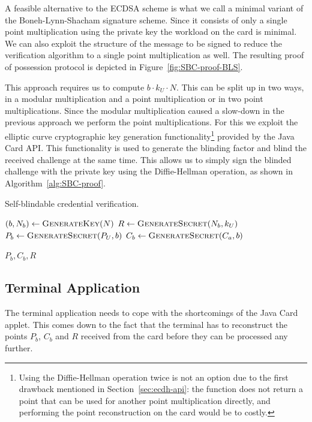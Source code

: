 A feasible alternative to the ECDSA scheme is what we call a minimal variant of
the Boneh-Lynn-Shacham signature scheme. Since it consists of only a single 
point multiplication using the private key the workload on the card is minimal.
We can also exploit the structure of the message to be signed to reduce the
verification algorithm to a single point multiplication as well. The resulting
proof of possession protocol is depicted in Figure~\ref{fig:SBC-proof-BLS}.

This approach requires us to compute $b \cdot k_U \cdot N$. This can be split
up in two ways, in a modular multiplication and a point multiplication or in two
point multiplications. Since the modular multiplication caused a slow-down in
the previous approach we perform the point multiplications. For this we exploit
the elliptic curve cryptographic key generation functionality\footnote{Using
the Diffie-Hellman operation twice is not an option due to the first drawback
mentioned in Section~\ref{sec:ecdh-api}: the function does not return a point
that can be used for another point multiplication directly, and performing the
point reconstruction on the card would be to costly.} provided by the Java Card
API. This functionality is used to generate the blinding factor and blind the
received challenge at the same time. This allows us to simply sign the blinded
challenge with the private key using the Diffie-Hellman operation, as shown in
Algorithm~\ref{alg:SBC-proof}.

\begin{algorithm}
  \caption{Self-blindable credential verification.}
  \label{alg:SBC-proof}
  \addtolength{\baselineskip}{1mm}
  \begin{algorithmic}[1]
      \State $(b, N_b) \gets \Call{GenerateKey}{N}$
      \State $R \gets \Call{GenerateSecret}{N_b, k_U}$
      \State $P_b \gets \Call{GenerateSecret}{P_U, b}$
      \State $C_b \gets \Call{GenerateSecret}{C_a, b}$

      \Return $P_b, C_b, R$
    \EndFunction
  \end{algorithmic}
\end{algorithm}


\subsection{Terminal Application}

The terminal application needs to cope with the shortcomings of the Java Card
applet. This comes down to the fact that the terminal has to reconstruct the
points $P_b$, $C_b$ and $R$ received from the card 
before they can be processed any further.

